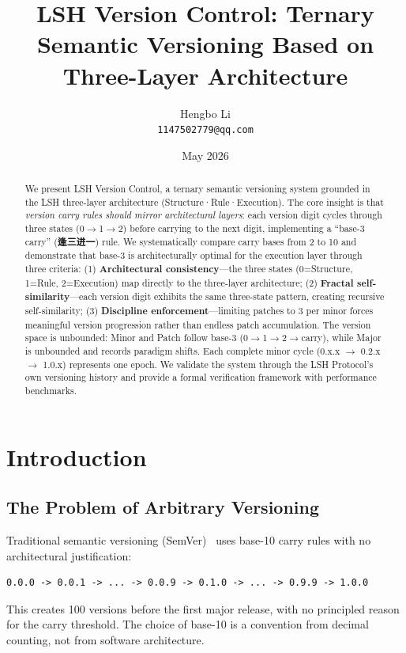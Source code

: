 \documentclass{article}
\title{LSH Version Control: Ternary Semantic Versioning Based on Three-Layer Architecture}
\author{Hengbo Li\\
\texttt{1147502779@qq.com}
}
\date{May 2026}
\begin{document}
\maketitle

\begin{abstract}
We present LSH Version Control, a ternary semantic versioning system grounded in the LSH three-layer architecture (Structure·Rule·Execution). The core insight is that \emph{version carry rules should mirror architectural layers}: each version digit cycles through three states (0$\to$1$\to$2) before carrying to the next digit, implementing a ``base-3 carry'' (\textbf{逢三进一}) rule. We systematically compare carry bases from 2 to 10 and demonstrate that base-3 is architecturally optimal for the execution layer through three criteria: (1) \textbf{Architectural consistency}---the three states (0=Structure, 1=Rule, 2=Execution) map directly to the three-layer architecture; (2) \textbf{Fractal self-similarity}---each version digit exhibits the same three-state pattern, creating recursive self-similarity; (3) \textbf{Discipline enforcement}---limiting patches to 3 per minor forces meaningful version progression rather than endless patch accumulation. The version space is unbounded: Minor and Patch follow base-3 (0$\to$1$\to$2$\to$carry), while Major is unbounded and records paradigm shifts. Each complete minor cycle (0.x.x $\to$ 0.2.x $\to$ 1.0.x) represents one epoch. We validate the system through the LSH Protocol's own versioning history and provide a formal verification framework with performance benchmarks.
\end{abstract}

\section{Introduction}

\subsection{The Problem of Arbitrary Versioning}

Traditional semantic versioning (SemVer)~\cite{semver} uses base-10 carry rules with no architectural justification:

\begin{verbatim}
0.0.0 -> 0.0.1 -> ... -> 0.0.9 -> 0.1.0 -> ... -> 0.9.9 -> 1.0.0
\end{verbatim}

This creates 100 versions before the first major release, with no principled reason for the carry threshold. The choice of base-10 is a convention from decimal counting, not from software architecture.
\end{document}
